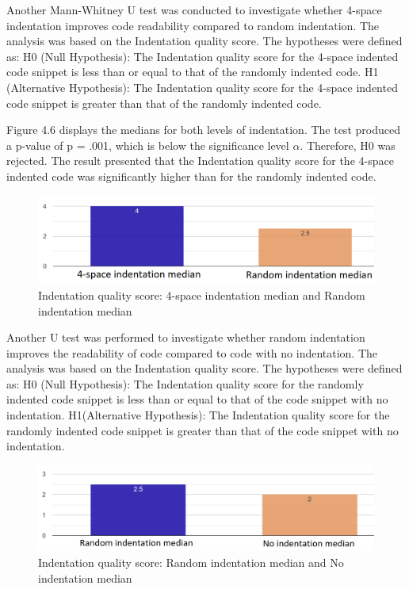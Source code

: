 Another Mann-Whitney U test was conducted to investigate whether 4-space indentation improves code readability compared to random indentation. The analysis was based on the Indentation quality score. The hypotheses were defined as:  H0 (Null Hypothesis): The Indentation quality score for the 4-space indented code snippet is less than or equal to that of the randomly indented code. H1 (Alternative Hypothesis): The Indentation quality score for the 4-space indented code snippet is greater than that of the randomly indented code.


Figure 4.6 displays the medians for both levels of indentation. 
The test produced a p-value of p = .001, which is below the significance level \(\alpha\). Therefore, H0 was rejected. The result presented that the Indentation quality score for the 4-space indented code was significantly higher than for the randomly indented code.

\begin{figure} [H]
  \centering
  \includegraphics[scale=0.58]{figures/4-r-q5.png}
  \caption{Indentation quality score: 4-space indentation median and Random indentation median}
  \label{fig:AnhangsChor}
\end{figure}


Another  U test was performed to investigate whether random indentation improves the readability of code compared to code with no indentation. The analysis was based on the Indentation quality score. The hypotheses were defined as:  H0 (Null Hypothesis): The Indentation quality score for the randomly indented code snippet is less than or equal to that of the code snippet with no indentation.  H1(Alternative Hypothesis): The Indentation quality score for the randomly indented code snippet is greater than that of the code snippet with no indentation.


\begin{figure} [H]
  \centering
  \includegraphics[scale=0.49]{figures/r-0-q5.png}
  \caption{Indentation quality score: Random indentation median and No indentation median}
  \label{fig:AnhangsChor}
\end{figure}

